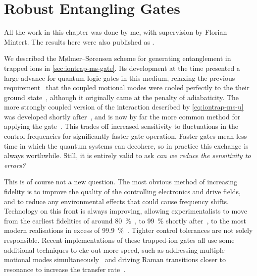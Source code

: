 \chapter{Robust Entangling Gates}
\label{sec:qubiterror}

\begin{coauthorship}
All the work in this chapter was done by me, with supervision by Florian Mintert.
The results here were also published as .
\end{coauthorship}


We described the M\o lmer--S\o rensen scheme for generating entanglement in trapped ions in \cref{sec:iontrap-ms-gate}.
Its development at the time presented a large advance for quantum logic gates in this medium, relaxing the previous requirement~\cite{Cirac1995} that the coupled motional modes were cooled perfectly to the their ground state~\cite{Sorensen1999}, although it originally came at the penalty of adiabaticity.
The more strongly coupled version of the interaction described by \cref{eq:iontrap-ms-u} was developed shortly after~\cite{Sorensen2000}, and is now by far the more common method for applying the gate~\cite{Gaebler2016,Harty2014,Debnath2016,Wright2019}.
This trades off increased sensitivity to fluctuations in the control frequencies for significantly faster gate operation.
Faster gates mean less time in which the quantum systems can decohere, so in practice this exchange is always worthwhile.
Still, it is entirely valid to ask \emph{can we reduce the sensitivity to errors?}

This is of course not a new question.
The most obvious method of increasing fidelity is to improve the quality of the controlling electronics and drive fields, and to reduce any environmental effects that could cause frequency shifts.
Technology on this front is always improving, allowing experimentalists to move from the earliest fidelities of around \qty{80}{\percent}~\cite{Haljan2005}, to \qty{99}{\percent} shortly after~\cite{Benhelm2008}, to the most modern realisations in excess of \qty{99.9}{\percent}~\cite{Gaebler2016}.
Tighter control tolerances are not solely responsible.
Recent implementations of these trapped-ion gates all use some additional techniques to eke out more speed, such as addressing multiple motional modes simultaneously~\cite{Choi2014,Arrazola2018} and driving Raman transitions closer to resonance to increase the transfer rate~\cite{Ballance2016}.

